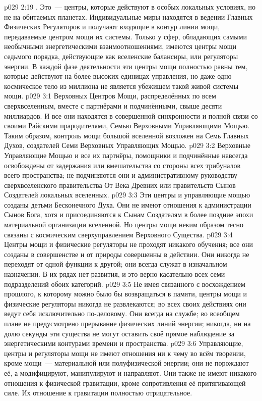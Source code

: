 \vs p029 2:19 . Это~--- центры, которые действуют в особых локальных условиях, но не на обитаемых планетах. Индивидуальные миры находятся в ведении Главных Физических Регуляторов и получают входящие в контур линии мощи, передаваемые центром мощи их системы. Только у сфер, обладающих самыми необычными энергетическими взаимоотношениями, имеются центры мощи седьмого порядка, действующие как вселенские балансиры, или регуляторы энергии. В каждой фазе деятельности эти центры мощи полностью равны тем, которые действуют на более высоких единицах управления, но даже одно космическое тело из миллиона не является убежищем такой живой системы мощи.
\vs p029 3:1 Верховных Центров Мощи, распределённых по всем сверхвселенным, вместе с партнёрами и подчинёнными, свыше десяти миллиардов. И все они находятся в совершенной синхронности и полной связи со своими Райскими прародителями, Семью Верховными Управляющими Мощью. Таким образом, контроль мощи большой вселенной возложен на Семь Главных Духов, создателей Семи Верховных Управляющих Мощью.
\vs p029 3:2 Верховные Управляющие Мощью и все их партнёры, помощники и подчинённые навсегда освобождены от задержания или вмешательства со стороны всех трибуналов всего пространства; не подчиняются они и административному руководству сверхвселенского правительства От Века Древних или правительств Сынов Создателей локальных вселенных.
\vs p029 3:3 Эти центры и управляющие мощью созданы детьми Бесконечного Духа. Они не имеют отношения к администрации Сынов Бога, хотя и присоединяются к Сынам Создателям в более поздние эпохи материальной организации вселенной. Но центры мощи неким образом тесно связаны с космическим сверхуправлением Верховного Существа.
\vs p029 3:4 \pc Центры мощи и физические регуляторы не проходят никакого обучения; все они созданы в совершенстве и от природы совершенны в действии. Они никогда не переходят от одной функции к другой; они всегда служат в изначальном назначении. В их рядах нет развития, и это верно касательно всех семи подразделений обоих категорий.
\vs p029 3:5 Не имея связанного с восхождением прошлого, к которому можно было бы возвращаться в памяти, центры мощи и физические регуляторы никогда не развлекаются; во всех своих действиях они ведут себя исключительно по\hyp{}деловому. Они всегда на службе; во всеобщем плане не предусмотрено прерывание физических линий энергии; никогда, ни на долю секунды эти существа не могут оставить своё прямое наблюдение за энергетическими контурами времени и пространства.
\vs p029 3:6 \pc Управляющие, центры и регуляторы мощи не имеют отношения ни к чему во всём творении, кроме мощи~--- материальной или полуфизической энергии; они не порождают её, а модифицируют, манипулируют и направляют. Они также не имеют никакого отношения к физической гравитации, кроме сопротивления её притягивающей силе. Их отношение к гравитации полностью отрицательное.
